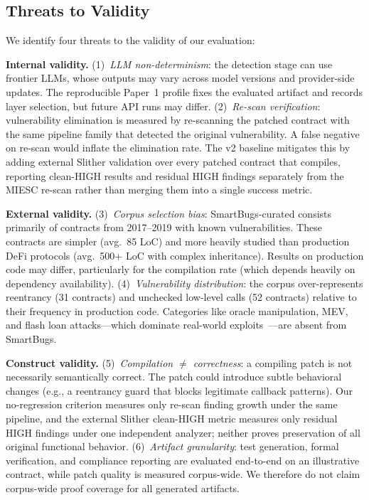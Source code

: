 \documentclass[conference]{IEEEtran}
\begin{document}
\subsection{Threats to Validity}
\label{sec:threats}

We identify four threats to the validity of our evaluation:

\textbf{Internal validity.} (1)~\emph{LLM non-determinism}: the detection stage can use frontier LLMs, whose outputs may vary across model versions and provider-side updates. The reproducible Paper~1 profile fixes the evaluated artifact and records layer selection, but future API runs may differ. (2)~\emph{Re-scan verification}: vulnerability elimination is measured by re-scanning the patched contract with the same pipeline family that detected the original vulnerability. A false negative on re-scan would inflate the elimination rate. The v2 baseline mitigates this by adding external Slither validation over every patched contract that compiles, reporting clean-HIGH results and residual HIGH findings separately from the MIESC re-scan rather than merging them into a single success metric.

\textbf{External validity.} (3)~\emph{Corpus selection bias}: SmartBugs-curated consists primarily of contracts from 2017--2019 with known vulnerabilities. These contracts are simpler (avg.\ 85 LoC) and more heavily studied than production DeFi protocols (avg.\ 500+ LoC with complex inheritance). Results on production code may differ, particularly for the compilation rate (which depends heavily on dependency availability). (4)~\emph{Vulnerability distribution}: the corpus over-represents reentrancy (31 contracts) and unchecked low-level calls (52 contracts) relative to their frequency in production code. Categories like oracle manipulation, MEV, and flash loan attacks---which dominate real-world exploits~\cite{atzei2017survey}---are absent from SmartBugs.

\textbf{Construct validity.} (5)~\emph{Compilation $\neq$ correctness}: a compiling patch is not necessarily semantically correct. The patch could introduce subtle behavioral changes (e.g., a reentrancy guard that blocks legitimate callback patterns). Our no-regression criterion measures only re-scan finding growth under the same pipeline, and the external Slither clean-HIGH metric measures only residual HIGH findings under one independent analyzer; neither proves preservation of all original functional behavior. (6)~\emph{Artifact granularity}: test generation, formal verification, and compliance reporting are evaluated end-to-end on an illustrative contract, while patch quality is measured corpus-wide. We therefore do not claim corpus-wide proof coverage for all generated artifacts.
\end{document}
